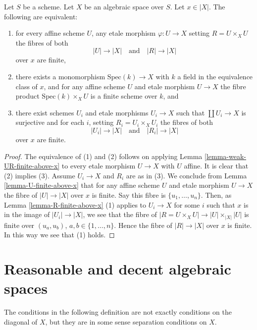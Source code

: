 \begin{lemma}
\label{lemma-UR-finite-above-x}
Let $S$ be a scheme. Let $X$ be an algebraic space over $S$.
Let $x \in |X|$. The following are equivalent:
\begin{enumerate}
\item for every affine scheme $U$, any etale morphism
$\varphi : U \to X$ setting $R = U \times_X U$ the fibres of both
$$
|U| \longrightarrow |X|
\quad\text{and}\quad
|R| \longrightarrow |X|
$$
over $x$ are finite,
\item there exists a monomorphism $\text{Spec}(k) \to X$ with $k$ a field
in the equivalence class of $x$, and for any affine scheme $U$ and etale
morphism $U \to X$ the fibre product $\text{Spec}(k) \times_X U$ is
a finite scheme over $k$, and
\item there exist schemes $U_i$ and etale morphisms
$U_i \to X$ such that $\coprod U_i \to X$ is surjective and for each
$i$, setting $R_i = U_i \times_X U_i$ the fibres of both
$$
|U_i| \longrightarrow |X|
\quad\text{and}\quad
|R_i| \longrightarrow |X|
$$
over $x$ are finite.
\end{enumerate}
\end{lemma}

\begin{proof}
The equivalence of (1) and (2) follows on applying
Lemma \ref{lemma-weak-UR-finite-above-x} to every etale morphism
$U \to X$ with $U$ affine. It is clear that (2) implies (3).
Assume $U_i \to X$ and $R_i$ are as in (3). We conclude from
Lemma \ref{lemma-U-finite-above-x}
that for any affine scheme $U$ and etale morphism $U \to X$
the fibre of $|U| \to |X|$ over $x$ is finite.
Say this fibre is $\{u_1, \ldots, u_n\}$.
Then, as
Lemma \ref{lemma-R-finite-above-x} (1)
applies to $U_i \to X$ for some $i$ such that $x$ is in the image of
$|U_i| \to |X|$, we see that the fibre of
$|R = U \times_X U| \to |U| \times_{|X|} |U|$
is finite over $(u_a, u_b)$, $a, b \in \{1, \ldots, n\}$.
Hence the fibre of $|R| \to |X|$ over $x$ is finite.
In this way we see that (1) holds.
\end{proof}







\section{Reasonable and decent algebraic spaces}
\label{section-reasonable-decent}

\noindent
The conditions in the following definition
are not exactly conditions on the diagonal of $X$, but they are in some
sense separation conditions on $X$.

